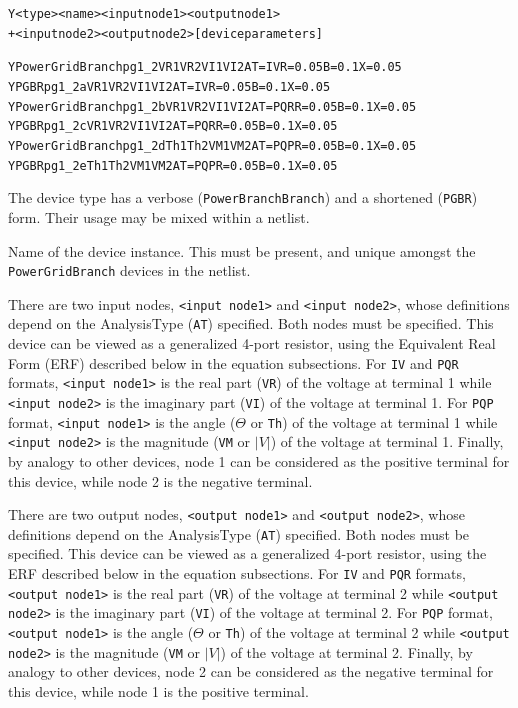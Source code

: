 \begin{Device}\label{PowerGridBranch}

\device
\begin{alltt}
Y<type> <name> <input node1> <output node1> 
+ <input node2> <output node2> [device parameters] 
\end{alltt}
  
\examples
\begin{alltt}
YPowerGridBranch pg1_2 VR1 VR2 VI1 VI2 AT=IV R=0.05 B=0.1 X=0.05
YPGBR pg1_2a VR1 VR2 VI1 VI2 AT=IV R=0.05 B=0.1 X=0.05
YPowerGridBranch pg1_2b VR1 VR2 VI1 VI2 AT=PQR R=0.05 B=0.1 X=0.05
YPGBR pg1_2c VR1 VR2 VI1 VI2 AT=PQR R=0.05 B=0.1 X=0.05
YPowerGridBranch pg1_2d Th1 Th2 VM1 VM2 AT=PQP R=0.05 B=0.1 X=0.05
YPGBR pg1_2e Th1 Th2 VM1 VM2 AT=PQP R=0.05 B=0.1 X=0.05
\end{alltt}

\parameters 
\begin{Parameters}
The device type has a verbose (\texttt{PowerBranchBranch}) and a shortened
(\texttt{PGBR}) form.  Their usage may be mixed within a netlist.

Name of the device instance. This must be present, and unique amongst the 
\texttt{PowerGridBranch} devices in the netlist.

There are two input nodes, \texttt{<input node1>} and \texttt{<input node2>}, 
whose definitions depend on the AnalysisType (\texttt{AT}) specified.  Both nodes
must be specified.  This device can be viewed as a generalized 4-port resistor, using
the Equivalent Real Form (ERF) described below in the equation subsections. For 
\texttt{IV} and \texttt{PQR} formats, \texttt{<input node1>} is the real part 
(\texttt{VR}) of the voltage at terminal 1 while \texttt{<input node2>} is the 
imaginary part (\texttt{VI}) of the voltage at terminal 1.  
For \texttt{PQP} format, \texttt{<input node1>} is the angle ($\Theta$ or \texttt{Th}) of the voltage 
at terminal 1 while \texttt{<input node2>} is the magnitude (\texttt{VM} or $|V|$) of the 
voltage at terminal 1.  Finally, by analogy to other \Xyce{} devices, node 1 can be 
considered as the positive terminal for this device, while node 2 is the negative
terminal.

There are two output nodes, \texttt{<output node1>} and \texttt{<output node2>}, 
whose definitions depend on the AnalysisType (\texttt{AT}) specified.  Both nodes
must be specified.  This device can be viewed as a generalized 4-port resistor, 
using the ERF described below in the equation subsections. For \texttt{IV} 
and \texttt{PQR} formats, \texttt{<output node1>} is the real part (\texttt{VR}) of 
the voltage at terminal 2 while \texttt{<output node2>} is the imaginary part 
(\texttt{VI}) of the voltage at terminal 2.  
For \texttt{PQP} format, \texttt{<output node1>} is the angle ($\Theta$ or \texttt{Th}) of the voltage 
at terminal 2 while \texttt{<output node2>} is the magnitude (\texttt{VM} or $|V|$) of the 
voltage at terminal 2.  Finally, by analogy to other \Xyce{} devices, node 2 can be 
considered as the negative terminal for this device, while node 1 is the positive
terminal.


\end{Parameters}
\end{Device}
